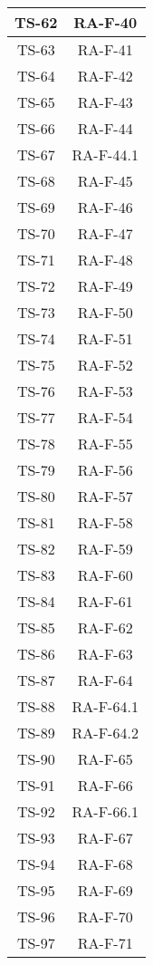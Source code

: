 \begin{center}
\begin{longtable}{|c|c|}
			\hline
			TS-62 & RA-F-40 \\
			\hline
			TS-63 & RA-F-41 \\
			\hline
			TS-64 & RA-F-42 \\
			\hline
			TS-65 & RA-F-43 \\
			\hline
			TS-66 & RA-F-44 \\
			\hline
			TS-67 & RA-F-44.1 \\
			\hline
			TS-68 & RA-F-45 \\
			\hline
			TS-69 & RA-F-46 \\
			\hline
			TS-70 & RA-F-47 \\
			\hline
			TS-71 & RA-F-48 \\
			\hline
			TS-72 & RA-F-49 \\
			\hline
			TS-73 & RA-F-50 \\
			\hline
			TS-74 & RA-F-51 \\
			\hline
			TS-75 & RA-F-52 \\
			\hline
			TS-76 & RA-F-53 \\
			\hline
			TS-77 & RA-F-54 \\
			\hline
			TS-78 & RA-F-55 \\
			\hline
			TS-79 & RA-F-56 \\
			\hline
			TS-80 & RA-F-57 \\
			\hline
			TS-81 & RA-F-58 \\
			\hline
			TS-82 & RA-F-59 \\
			\hline
			TS-83 & RA-F-60 \\
			\hline
			TS-84 & RA-F-61 \\
			\hline
			TS-85 & RA-F-62 \\
			\hline
			TS-86 & RA-F-63 \\
			\hline
			TS-87 & RA-F-64 \\
			\hline
			TS-88 & RA-F-64.1 \\
			\hline
			TS-89 & RA-F-64.2 \\
			\hline
			TS-90 & RA-F-65 \\
			\hline
			TS-91 & RA-F-66 \\
			\hline
			TS-92 & RA-F-66.1 \\
			\hline
			TS-93 & RA-F-67 \\
			\hline
			TS-94 & RA-F-68 \\
			\hline
			TS-95 & RA-F-69 \\
			\hline
			TS-96 & RA-F-70 \\
			\hline
			TS-97 & RA-F-71 \\

\end{longtable}
\end{center}
